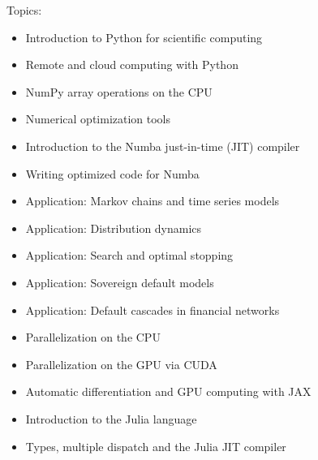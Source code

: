 \documentclass[12pt]{article}
\begin{document}
Topics:
%
\begin{itemize}
    \item Introduction to Python for scientific computing
    \item Remote and cloud computing with Python
    \item NumPy array operations on the CPU
    \item Numerical optimization tools
    \item Introduction to the Numba just-in-time (JIT) compiler
    \item Writing optimized code for Numba
    \item Application: Markov chains and time series models
    \item Application: Distribution dynamics
    \item Application: Search and optimal stopping
    \item Application: Sovereign default models
    \item Application: Default cascades in financial networks
    \item Parallelization on the CPU
    \item Parallelization on the GPU via CUDA
    \item Automatic differentiation and GPU computing with JAX
    \item Introduction to the Julia language
    \item Types, multiple dispatch and the Julia JIT compiler
\end{itemize}
\end{document}
